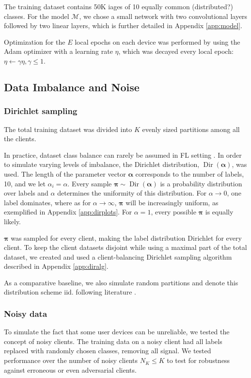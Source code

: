 \documentclass{article}
\begin{document}
The training dataset contains 50K iages of 10 equally common (distributed?) classes.
For the model $\mathcal M$, we chose a small network with two convolutional layers followed by two linear layers, which is further detailed in Appendix \ref{app:model}.

Optimization for the $E$ local epochs on each device was performed by using the Adam optimizer \cite{kingma2015adam} with a learning rate $\eta$, which was decayed every local epoch: $\eta\leftarrow\gamma\eta, \gamma\le 1$.

\subsection{Data Imbalance and Noise}
\subsubsection{Dirichlet sampling}
The total training dataset was divided into $K$ evenly sized partitions among all the clients.

In practice, dataset class balance can rarely be assumed in FL setting \cite{kai2021advances}.
In order to simulate varying levels of imbalance, the Dirichlet distribution, $\operatorname{Dir}(\bm\alpha)$, was used.
The length of the parameter vector  $\bm\alpha$ corresponds to the number of labels, 10, and we let $\alpha_i=\alpha$.
Every sample $\bm\pi\sim\operatorname{Dir}(\bm\alpha)$ is a probability distribution over labels and $\alpha$ determines the uniformity of this distribution.
For $\alpha\to0$, one label dominates, where as for $\alpha\to\infty$, $\bm\pi$ will be increasingly uniform, as exemplified in Appendix \ref{app:dirplots}.
For $\alpha=1$, every possible $\bm\pi$ is equally likely.

$\bm\pi$ was sampled for every client, making the label distribution Dirichlet for every client.
To keep the client datasets disjoint while using a maximal part of the total dataset, we created and used a client-balancing Dirichlet sampling algorithm described in Appendix \ref{app:diralg}.

As a comparative baseline, we also simulate random partitions and denote this distribution scheme iid. following literature \cite{lin2020ensemble}.

\subsubsection{Noisy data}
To simulate the fact that some user devices can be unreliable, we tested the concept of noisy clients.
The training data on a noisy client had all labels replaced with randomly chosen classes, removing all signal.
We tested performance over the number of noisy clients $N_K\leq K$ to test for robustness against erroneous or even adversarial clients.
\end{document}

